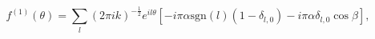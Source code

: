 \begin{equation}
f^{\left( 1\right) }(\theta )=\sum_{l}
\left( 2\pi ik\right) ^{-\frac{1}{2}}
e^{il\theta }\left[ -i\pi
\alpha \mathrm{sgn}\left( l\right) \left( 1-\delta _{l,0}\right) -i\pi \alpha \delta
_{l,0}\cos\beta
\right],
\end{equation}

